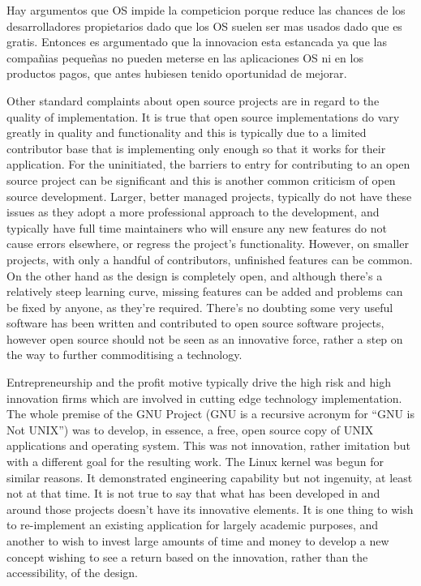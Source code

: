 Hay argumentos que OS impide la competicion porque reduce las chances de los desarrolladores propietarios dado que los OS suelen ser mas usados dado que es gratis. Entonces es argumentado que la innovacion esta estancada ya que las compañias pequeñas no pueden meterse en las aplicaciones OS ni en los productos pagos, que antes hubiesen tenido oportunidad de mejorar.

Other standard complaints about open source projects are in regard to the quality
of implementation. It is true that open source implementations do vary greatly
in quality and functionality and this is typically due to a limited contributor base
that is implementing only enough so that it works for their application. For the
uninitiated, the barriers to entry for contributing to an open source project can
be significant and this is another common criticism of open source development.
Larger, better managed projects, typically do not have these issues as they adopt a
more professional approach to the development, and typically have full time maintainers
who will ensure any new features do not cause errors elsewhere, or regress
the project’s functionality. However, on smaller projects, with only a handful of
contributors, unfinished features can be common. On the other hand as the design
is completely open, and although there’s a relatively steep learning curve, missing
features can be added and problems can be fixed by anyone, as they’re required.
There’s no doubting some very useful software has been written and contributed
to open source software projects, however open source should not be seen as an innovative
force, rather a step on the way to further commoditising a technology.

Entrepreneurship and the profit motive typically drive the high risk and high innovation
firms which are involved in cutting edge technology implementation. The
whole premise of the GNU Project (GNU is a recursive acronym for “GNU is Not
UNIX”) was to develop, in essence, a free, open source copy of UNIX applications
and operating system. This was not innovation, rather imitation but with a different
goal for the resulting work. The Linux kernel was begun for similar reasons.
It demonstrated engineering capability but not ingenuity, at least not at that time.
It is not true to say that what has been developed in and around those projects
doesn’t have its innovative elements. It is one thing to wish to re-implement an
existing application for largely academic purposes, and another to wish to invest
large amounts of time and money to develop a new concept wishing to see a return
based on the innovation, rather than the accessibility, of the design.

